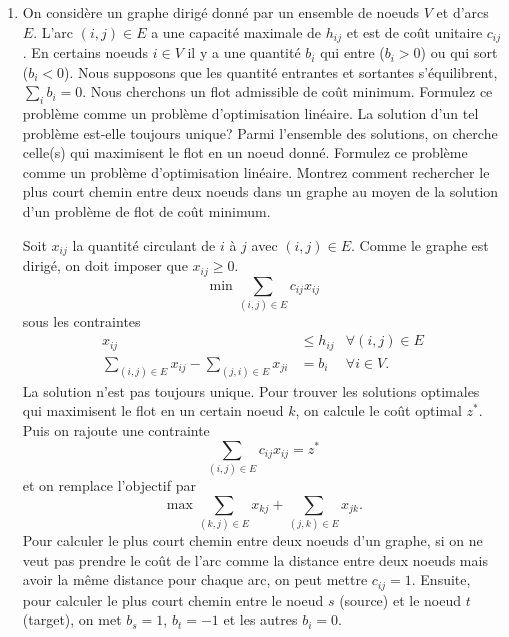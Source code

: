 \begin{enumerate}
  \item On considère  un graphe dirigé donné par un ensemble de noeuds $V$ et d'arcs $E$. L'arc
    $(i, j) \in E$ a une  capacité maximale de
    $h_{ij}$ et est de coût unitaire
    $c_{ij}$. En certains noeuds
    $i \in V$ il y a une quantité
    $b_i$ qui entre  ($b_i >0$) ou qui sort ($b_i <0$). Nous supposons que les quantité entrantes et sortantes s'équilibrent, $\sum_i b_i=0$. Nous
    cherchons un flot admissible de coût minimum.  Formulez ce problème comme un problème d'optimisation linéaire. La solution d'un tel problème est-elle
    toujours unique? Parmi l'ensemble des solutions, on cherche celle(s) qui maximisent le flot en un noeud donn\'e.
    Formulez ce probl\`eme comme un probl\`eme d'optimisation lin\'eaire. Montrez comment  rechercher le   plus court chemin entre deux noeuds dans un
    graphe au moyen de la solution d'un  problème de flot de coût minimum.

    \begin{solution}
      Soit $x_{ij}$ la quantité circulant de $i$ à $j$ avec $(i,j) \in E$.
      Comme le graphe est dirigé, on doit imposer que $x_{ij} \geq 0$.
      \[ \min \sum_{(i,j) \in E} c_{ij}x_{ij} \]
      sous les contraintes
      \begin{align*}
        x_{ij} & \leq h_{ij} & \forall (i,j) \in E\\
        \sum_{(i,j) \in E} x_{ij} - \sum_{(j,i) \in E} x_{ji}
        & = b_{i} & \forall i \in V.
      \end{align*}
      La solution n'est pas toujours unique.
      Pour trouver les solutions optimales qui maximisent
      le flot en un certain noeud $k$, on calcule le coût optimal $z^*$.
      Puis on rajoute une contrainte
      \[ \sum_{(i,j) \in E} c_{ij}x_{ij} = z^* \]
      et on remplace l'objectif par
      \[ \max \sum_{(k,j) \in E} x_{kj} + \sum_{(j,k) \in E} x_{jk}. \]
      Pour calculer le plus court chemin entre deux noeuds d'un graphe,
      si on ne veut pas prendre le coût de l'arc comme la distance entre
      deux noeuds mais avoir la même distance pour chaque arc,
      on peut mettre $c_{ij} = 1$.
      Ensuite, pour calculer le plus court chemin entre
      le noeud $s$ (source) et le noeud $t$ (target),
      on met $b_s = 1$, $b_t = -1$ et les autres $b_i = 0$.
    \end{solution}

\end{enumerate}

